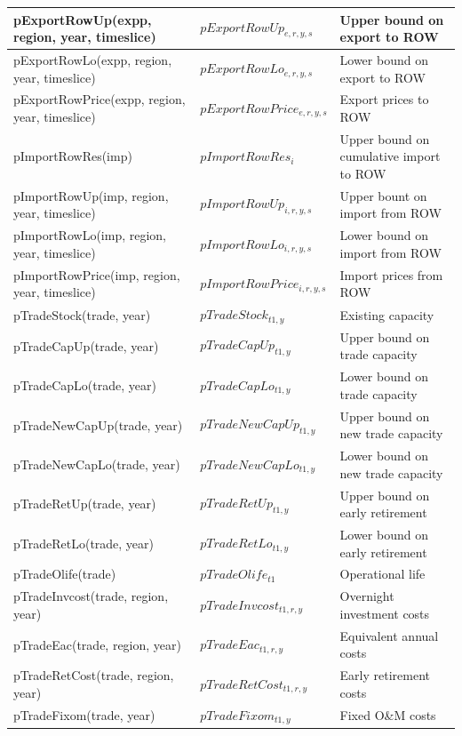 \documentclass{article}
\begin{document}
\begin{longtable}{|p{10cm}|p{5cm}|p{9cm}|}
 \hline
pExportRowUp(expp, region, year, timeslice) & $pExportRowUp_{e,r,y,s}$ & Upper bound on export to ROW \\
 \hline
pExportRowLo(expp, region, year, timeslice) & $pExportRowLo_{e,r,y,s}$ & Lower bound on export to ROW \\
 \hline
pExportRowPrice(expp, region, year, timeslice) & $pExportRowPrice_{e,r,y,s}$ & Export prices to ROW \\
 \hline
pImportRowRes(imp) & $pImportRowRes_{i}$ & Upper bound on cumulative import to ROW \\
 \hline
pImportRowUp(imp, region, year, timeslice) & $pImportRowUp_{i,r,y,s}$ & Upper bount on import from ROW \\
 \hline
pImportRowLo(imp, region, year, timeslice) & $pImportRowLo_{i,r,y,s}$ & Lower bound on import from ROW \\
 \hline
pImportRowPrice(imp, region, year, timeslice) & $pImportRowPrice_{i,r,y,s}$ & Import prices from ROW \\
 \hline
pTradeStock(trade, year) & $pTradeStock_{t1,y}$ & Existing capacity \\
 \hline
pTradeCapUp(trade, year) & $pTradeCapUp_{t1,y}$ & Upper bound on trade capacity \\
 \hline
pTradeCapLo(trade, year) & $pTradeCapLo_{t1,y}$ & Lower bound on trade capacity \\
 \hline
pTradeNewCapUp(trade, year) & $pTradeNewCapUp_{t1,y}$ & Upper bound on new trade capacity \\
 \hline
pTradeNewCapLo(trade, year) & $pTradeNewCapLo_{t1,y}$ & Lower bound on new trade capacity \\
 \hline
pTradeRetUp(trade, year) & $pTradeRetUp_{t1,y}$ & Upper bound on early retirement \\
 \hline
pTradeRetLo(trade, year) & $pTradeRetLo_{t1,y}$ & Lower bound on early retirement \\
 \hline
pTradeOlife(trade) & $pTradeOlife_{t1}$ & Operational life \\
 \hline
pTradeInvcost(trade, region, year) & $pTradeInvcost_{t1,r,y}$ & Overnight investment costs \\
 \hline
pTradeEac(trade, region, year) & $pTradeEac_{t1,r,y}$ & Equivalent annual costs \\
 \hline
pTradeRetCost(trade, region, year) & $pTradeRetCost_{t1,r,y}$ & Early retirement costs \\
 \hline
pTradeFixom(trade, year) & $pTradeFixom_{t1,y}$ & Fixed O\&M costs \\

\end{longtable}
\end{document}
